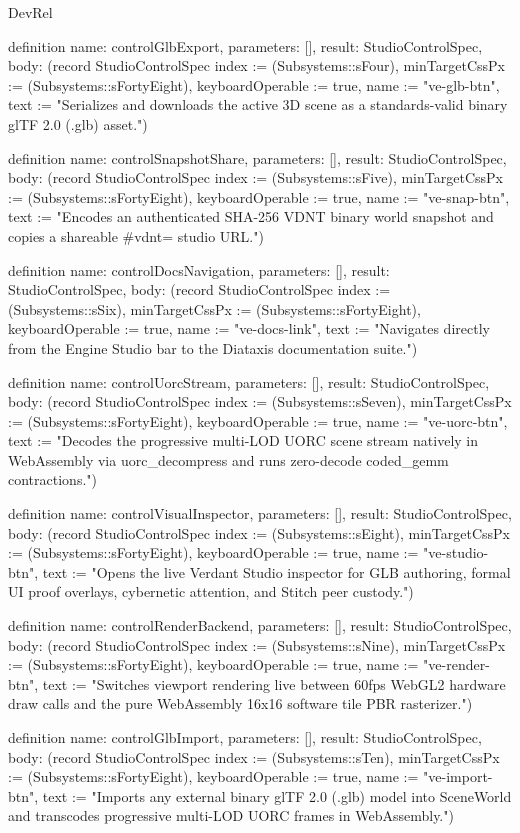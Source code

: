\begin{lexlean}{DevRel}
\begin{semanticmodule}
definition{
  name: controlGlbExport,
  parameters: [],
  result: StudioControlSpec,
  body: (record StudioControlSpec {index := (Subsystems::sFour), minTargetCssPx := (Subsystems::sFortyEight), keyboardOperable := true, name := "ve-glb-btn", text := "Serializes and downloads the active 3D scene as a standards-valid binary glTF 2.0 (.glb) asset."})
}

definition{
  name: controlSnapshotShare,
  parameters: [],
  result: StudioControlSpec,
  body: (record StudioControlSpec {index := (Subsystems::sFive), minTargetCssPx := (Subsystems::sFortyEight), keyboardOperable := true, name := "ve-snap-btn", text := "Encodes an authenticated SHA-256 VDNT binary world snapshot and copies a shareable #vdnt= studio URL."})
}

definition{
  name: controlDocsNavigation,
  parameters: [],
  result: StudioControlSpec,
  body: (record StudioControlSpec {index := (Subsystems::sSix), minTargetCssPx := (Subsystems::sFortyEight), keyboardOperable := true, name := "ve-docs-link", text := "Navigates directly from the Engine Studio bar to the Diataxis documentation suite."})
}

definition{
  name: controlUorcStream,
  parameters: [],
  result: StudioControlSpec,
  body: (record StudioControlSpec {index := (Subsystems::sSeven), minTargetCssPx := (Subsystems::sFortyEight), keyboardOperable := true, name := "ve-uorc-btn", text := "Decodes the progressive multi-LOD UORC scene stream natively in WebAssembly via uorc_decompress and runs zero-decode coded_gemm contractions."})
}

definition{
  name: controlVisualInspector,
  parameters: [],
  result: StudioControlSpec,
  body: (record StudioControlSpec {index := (Subsystems::sEight), minTargetCssPx := (Subsystems::sFortyEight), keyboardOperable := true, name := "ve-studio-btn", text := "Opens the live Verdant Studio inspector for GLB authoring, formal UI proof overlays, cybernetic attention, and Stitch peer custody."})
}

definition{
  name: controlRenderBackend,
  parameters: [],
  result: StudioControlSpec,
  body: (record StudioControlSpec {index := (Subsystems::sNine), minTargetCssPx := (Subsystems::sFortyEight), keyboardOperable := true, name := "ve-render-btn", text := "Switches viewport rendering live between 60fps WebGL2 hardware draw calls and the pure WebAssembly 16x16 software tile PBR rasterizer."})
}

definition{
  name: controlGlbImport,
  parameters: [],
  result: StudioControlSpec,
  body: (record StudioControlSpec {index := (Subsystems::sTen), minTargetCssPx := (Subsystems::sFortyEight), keyboardOperable := true, name := "ve-import-btn", text := "Imports any external binary glTF 2.0 (.glb) model into SceneWorld and transcodes progressive multi-LOD UORC frames in WebAssembly."})
}


\end{semanticmodule}
\end{lexlean}
